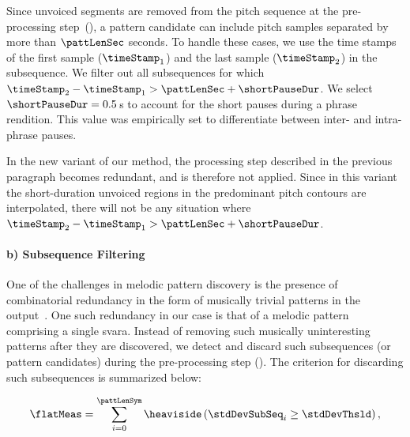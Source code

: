 Since unvoiced segments are removed from the pitch sequence at the pre-processing step~(), a pattern candidate can include pitch samples separated by more than $\pattLenSec$ seconds. To handle these cases, we use the time stamps of the first sample ($\timeStamp_1$) and the last sample ($\timeStamp_2$) in the subsequence. We filter out all subsequences for which $\timeStamp_2-\timeStamp_1 > \pattLenSec + \shortPauseDur$. We select $\shortPauseDur =0.5$\,s to account for the short pauses during a phrase rendition. This value was empirically set to differentiate between inter- and intra-phrase pauses. 

In the new variant of our method, the processing step described in the previous paragraph becomes redundant, and is therefore not applied. Since in this variant the short-duration unvoiced regions in the predominant pitch contours are interpolated, there will not be any situation where $\timeStamp_2-\timeStamp_1 > \pattLenSec + \shortPauseDur$. 


\paragraph{b) Subsequence Filtering} 

One of the challenges in melodic pattern discovery is the presence of combinatorial redundancy in the form of musically trivial patterns in the output~\citep{Lartillot2005}. One such redundancy in our case is that of a melodic pattern comprising a single \gls{svara}. Instead of removing such musically uninteresting patterns after they are discovered, we detect and discard such subsequences (or pattern candidates) during the pre-processing step (). The criterion for discarding such subsequences is summarized below:

\begin{equation}
\label{eq:flatness_measure}
\flatMeas =\sum_{i=0}^{\pattLenSym} \heaviside\left(\stdDevSubSeq_i\geq \stdDevThsld\right),
\end{equation}


